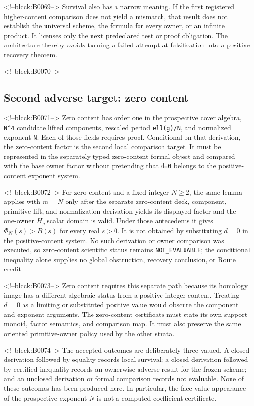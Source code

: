 \documentclass[11pt]{article}
\begin{document}
<!--block:B0069-->
Survival also has a narrow meaning. If the first registered
higher-content comparison does not yield a mismatch, that result does
not establish the universal scheme, the formula for every owner, or an
infinite product. It licenses only the next predeclared test or proof
obligation. The architecture thereby avoids turning a failed attempt at
falsification into a positive recovery theorem.

<!--block:B0070-->
\hypertarget{43-second-adverse-target-zero-content}{%
\subsection{Second adverse target: zero
content}\label{43-second-adverse-target-zero-content}}

<!--block:B0071-->
Zero content has order one in the prospective cover algebra,
\texttt{N\^{}4} candidate lifted components, rescaled period
\texttt{ell(g)/N}, and normalized exponent \texttt{N}. Each of those
fields requires proof. Conditional on that derivation, the zero-content
factor is the second local comparison target. It must be represented in
the separately typed zero-content formal object and compared with the
base owner factor without pretending that \texttt{d=0} belongs to the
positive-content exponent system.

<!--block:B0072-->
For zero content and a fixed integer \(N\geq2\), the same lemma applies
with \(m=N\) only after the separate zero-content deck, component,
primitive-lift, and normalization derivation yields its displayed factor and the
one-owner \(H_g\) scalar domain is valid.  Under those antecedents it gives
\(\Phi_N(s)>B(s)\) for every real \(s>0\).  It is not obtained by substituting
\(d=0\) in the positive-content system.  No such derivation or owner comparison
was executed, so zero-content scientific status remains
\texttt{NOT\_EVALUABLE}; the conditional inequality alone supplies no global
obstruction, recovery conclusion, or Route credit.

<!--block:B0073-->
Zero content requires this separate path because its homology image has
a different algebraic status from a positive integer content. Treating
$d=0$ as a limiting or substituted positive value would obscure the
component and exponent arguments. The zero-content certificate must
state its own support monoid, factor semantics, and comparison map. It
must also preserve the same oriented primitive-owner policy used by the
other strata.

<!--block:B0074-->
The accepted outcomes are deliberately three-valued. A closed
derivation followed by equality records local survival; a closed
derivation followed by certified inequality records an ownerwise
adverse result for the frozen scheme; and an unclosed derivation or
formal comparison records not evaluable. None of these outcomes has
been produced here. In particular, the face-value appearance of the
prospective exponent $N$ is not a computed coefficient certificate.
\end{document}
